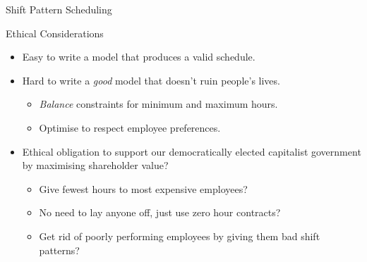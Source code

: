 \documentclass{beamer}
\begin{document}
\begin{frame}{Shift Pattern Scheduling}
    \vspace*{-0.5em}%
    \only<2>{}%
    \only<3>{}%
    \only<4>{}%
\end{frame}

\begin{frame}{Ethical Considerations}
    \begin{itemize}
        \item Easy to write a model that produces a valid schedule.
        \item Hard to write a \emph{good} model that doesn't ruin people's lives.
            \begin{itemize}
                \item \emph{Balance} constraints for minimum and maximum hours.
                \item Optimise to respect employee preferences.
            \end{itemize}
        \item <2-> Ethical obligation to support our democratically elected
            capitalist government by maximising shareholder value?
            \begin{itemize}
                \item <2-> Give fewest hours to most expensive employees?
                \item <2-> No need to lay anyone off, just use zero hour contracts?
                \item <2-> Get rid of poorly performing employees by giving them
                    bad shift patterns?
            \end{itemize}
    \end{itemize}
\end{frame}
\end{document}
